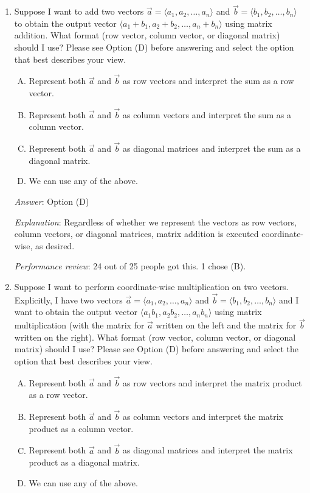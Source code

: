 \documentclass[10pt]{amsart}
\begin{document}
\begin{enumerate}
\item Suppose I want to add two vectors $\vec{a} = \langle a_1, a_2,\dots,a_n
  \rangle$ and $\vec{b} = \langle b_1,b_2,\dots,b_n \rangle$ to obtain the
  output vector $\langle a_1 + b_1, a_2 + b_2, \dots, a_n + b_n
  \rangle$ using matrix addition. What format (row vector, column
  vector, or diagonal matrix) should I use? Please see Option (D)
  before answering and select the option that best describes your view.

  \begin{enumerate}[(A)]
  \item Represent both $\vec{a}$ and $\vec{b}$ as row vectors and
    interpret the sum as a row vector.
  \item Represent both $\vec{a}$ and $\vec{b}$ as column vectors and
    interpret the sum as a column vector.
  \item Represent both $\vec{a}$ and $\vec{b}$ as diagonal matrices and
    interpret the sum as a diagonal matrix.
  \item We can use any of the above.
  \end{enumerate}

  {\em Answer}: Option (D)

  {\em Explanation}: Regardless of whether we represent the vectors as
  row vectors, column vectors, or diagonal matrices, matrix addition
  is executed coordinate-wise, as desired.

  {\em Performance review}: 24 out of 25 people got this. 1 chose (B).

\item Suppose I want to perform coordinate-wise multiplication on two
  vectors. Explicitly, I have two vectors $\vec{a} = \langle a_1,
  a_2,\dots,a_n \rangle$ and $\vec{b} = \langle b_1,b_2,\dots,b_n
  \rangle$ and I want to obtain the output vector $\langle a_1b_1,
  a_2b_2, \dots, a_nb_n \rangle$ using matrix multiplication (with the
  matrix for $\vec{a}$ written on the left and the matrix for
  $\vec{b}$ written on the right). What format (row vector, column
  vector, or diagonal matrix) should I use?  Please see Option (D)
  before answering and select the option that best describes your
  view.

  \begin{enumerate}[(A)]
  \item Represent both $\vec{a}$ and $\vec{b}$ as row vectors and
    interpret the matrix product as a row vector.
  \item Represent both $\vec{a}$ and $\vec{b}$ as column vectors and
    interpret the matrix product as a column vector.
  \item Represent both $\vec{a}$ and $\vec{b}$ as diagonal matrices and
    interpret the matrix product as a diagonal matrix.
  \item We can use any of the above.
  \end{enumerate}


\end{enumerate}
\end{document}
